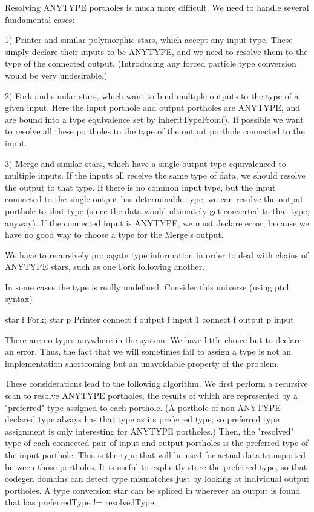 Resolving ANYTYPE portholes is much more difficult.  We need to handle
several fundamental cases:

1) Printer and similar polymorphic stars, which accept any input type.
These simply declare their inputs to be ANYTYPE, and we need to resolve
them to the type of the connected output.  (Introducing any forced particle
type conversion would be very undesirable.)

2) Fork and similar stars, which want to bind multiple outputs to the type
of a given input.  Here the input porthole and output portholes are ANYTYPE,
and are bound into a type equivalence set by inheritTypeFrom().  If possible
we want to resolve all these portholes to the type of the output porthole
connected to the input.

3) Merge and similar stars, which have a single output type-equivalenced to
multiple inputs.  If the inputs all receive the same type of data, we should
resolve the output to that type.  If there is no common input type, but the
input connected to the single output has determinable type, we can resolve
the output porthole to that type (since the data would ultimately get
converted to that type, anyway).  If the connected input is ANYTYPE, we must
declare error, because we have no good way to choose a type for the Merge's
output.

We have to recursively propagate type information in order to deal with
chains of ANYTYPE stars, such as one Fork following another.

In some cases the type is really undefined.  Consider this universe
(using ptcl syntax)

\begin{example}
star f Fork; star p Printer
connect f output f input 1
connect f output p input
\end{example}

There are no types anywhere in the system.  We have little choice
but to declare an error.  Thus, the fact that we will sometimes
fail to assign a type is not an implementation shortcoming but an
unavoidable property of the problem.

These considerations lead to the following algorithm.  We first perform
a recursive scan to resolve ANYTYPE portholes, the results of which are
represented by a "preferred" type assigned to each porthole.  (A porthole
of non-ANYTYPE declared type always has that type as its preferred type;
so preferred type assignment is only interesting for ANYTYPE portholes.)
Then, the "resolved" type of each connected pair of input and output
portholes is the preferred type of the input porthole.  This is the type
that will be used for actual data transported between those portholes.
It is useful to explicitly store the preferred type, so that codegen domains
can detect type mismatches just by looking at individual output portholes.
A type conversion star can be spliced in wherever an output is found that
has preferredType != resolvedType.

